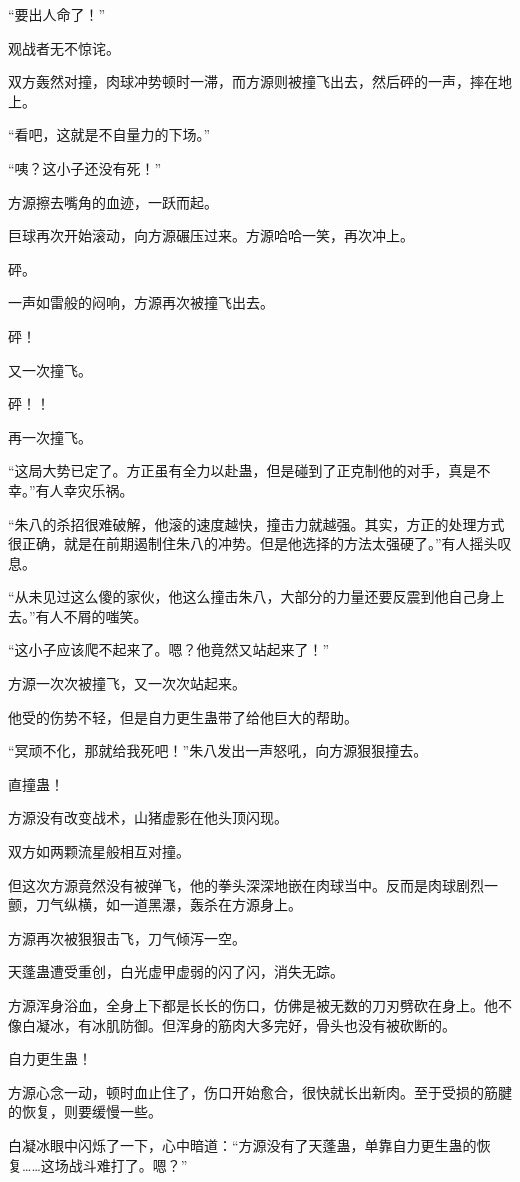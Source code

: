 \begin{this_body}
“要出人命了！”

观战者无不惊诧。

双方轰然对撞，肉球冲势顿时一滞，而方源则被撞飞出去，然后砰的一声，摔在地上。

“看吧，这就是不自量力的下场。”

“咦？这小子还没有死！”

方源擦去嘴角的血迹，一跃而起。

巨球再次开始滚动，向方源碾压过来。方源哈哈一笑，再次冲上。

砰。

一声如雷般的闷响，方源再次被撞飞出去。

砰！

又一次撞飞。

砰！！

再一次撞飞。

“这局大势已定了。方正虽有全力以赴蛊，但是碰到了正克制他的对手，真是不幸。”有人幸灾乐祸。

“朱八的杀招很难破解，他滚的速度越快，撞击力就越强。其实，方正的处理方式很正确，就是在前期遏制住朱八的冲势。但是他选择的方法太强硬了。”有人摇头叹息。

“从未见过这么傻的家伙，他这么撞击朱八，大部分的力量还要反震到他自己身上去。”有人不屑的嗤笑。

“这小子应该爬不起来了。嗯？他竟然又站起来了！”

方源一次次被撞飞，又一次次站起来。

他受的伤势不轻，但是自力更生蛊带了给他巨大的帮助。

“冥顽不化，那就给我死吧！”朱八发出一声怒吼，向方源狠狠撞去。

直撞蛊！

方源没有改变战术，山猪虚影在他头顶闪现。

双方如两颗流星般相互对撞。

但这次方源竟然没有被弹飞，他的拳头深深地嵌在肉球当中。反而是肉球剧烈一颤，刀气纵横，如一道黑瀑，轰杀在方源身上。

方源再次被狠狠击飞，刀气倾泻一空。

天蓬蛊遭受重创，白光虚甲虚弱的闪了闪，消失无踪。

方源浑身浴血，全身上下都是长长的伤口，仿佛是被无数的刀刃劈砍在身上。他不像白凝冰，有冰肌防御。但浑身的筋肉大多完好，骨头也没有被砍断的。

自力更生蛊！

方源心念一动，顿时血止住了，伤口开始愈合，很快就长出新肉。至于受损的筋腱的恢复，则要缓慢一些。

白凝冰眼中闪烁了一下，心中暗道：“方源没有了天蓬蛊，单靠自力更生蛊的恢复……这场战斗难打了。嗯？”


\end{this_body}
